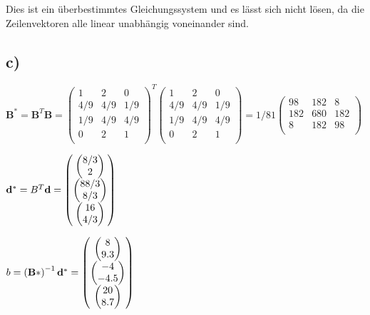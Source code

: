 Dies ist ein \"uberbestimmtes Gleichungssystem und es l\"asst sich nicht l\"osen, da die Zeilenvektoren alle linear unabh\"angig voneinander sind.

\subsection*{c)}
$\mathbf{B} ^* = \mathbf{B}^T \mathbf{B} =  \left( \begin{matrix} 
    1 & 2 &0 \\
    4/9 & 4/9 &1/9 \\
    1/9 & 4/9 & 4/9 \\
    0 & 2 &1  \\
\end{matrix} \right) ^T     \left( \begin{matrix} 
        1 & 2 &0 \\
        4/9 & 4/9 &1/9 \\
        1/9 & 4/9 & 4/9 \\
        0 & 2 &1  \\
    \end{matrix} \right) =     1/81\left( \begin{matrix} 
            98 & 182 &8 \\
            182 & 680 &182 \\
            8 & 182 & 98 \\
        \end{matrix} \right) $ 
        
$\mathbf{d}^* = B^T \mathbf{d} = \left( \begin{matrix} \left( \begin{matrix}8/3 \\ 2 \end{matrix}\right) \\ \left( \begin{matrix} 88/3 \\ 8/3\end{matrix}\right) \\ \left( \begin{matrix}16 \\ 4/3 \end{matrix}\right)\end{matrix}\right) $

$b = \left(\mathbf{B*} \right)^{-1} \mathbf{d^*} = \left( \begin{matrix} \left( \begin{matrix}8 \\ 9.3  \end{matrix}\right) \\ \left( \begin{matrix} -4  \\ -4.5\end{matrix}\right) \\ \left( \begin{matrix}20 \\ 8.7 \end{matrix}\right)\end{matrix}\right) $



